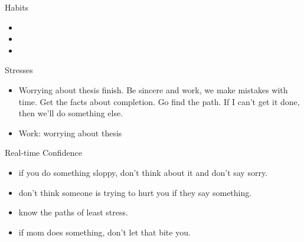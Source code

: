 \documentclass[serif, mathserif, final]{beamer}
\begin{document}
\begin{frame}{} 
  \begin{columns}
    \begin{column}{0.25\linewidth} %

\begin{block}{Habits}
\begin{itemize}
\tiny \item \tiny 
\item \tiny 
\item \tiny 
\end{itemize}
  
\end{block}

      \begin{block}{Stresses}
        \begin{itemize}
          \tiny \item \tiny Worrying about thesis finish. Be sincere and work, we
          make mistakes with time. Get the facts about completion. Go
          find the path. If I can't get it done, then we'll do
          something else. 
          \tiny \item \tiny Work: worrying about thesis  
        \end{itemize} 
      \end{block} 
      
     \begin{block}{Real-time Confidence}
     \begin{itemize}
       \tiny \item \tiny if you do something sloppy, don't
       think about it and don't say sorry.
     \item \tiny don't think someone is trying to hurt you if
       they say something.
     \item \tiny know the paths of least stress.
     \item \tiny if mom does something, don't let that bite
       you.
     \end{itemize}
     \end{block}
     

\end{column}
\end{columns}
\end{frame}
\end{document}
